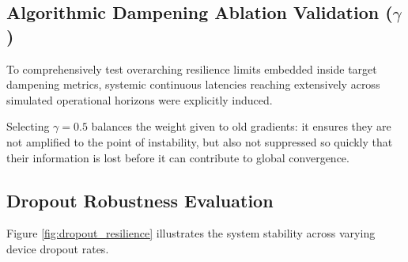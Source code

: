 \documentclass[conference]{IEEEtran}
\begin{document}
\subsection{Algorithmic Dampening Ablation Validation ($\gamma$)}
To comprehensively test overarching resilience limits embedded inside target dampening metrics, systemic continuous latencies reaching extensively across simulated operational horizons were explicitly induced.

\begin{table}[htbp]
\centering
\caption{Decay Metric Stabilization Limits ($\gamma$ scaling)}
\label{tab:dampening}
\begin{center}
\end{center}
\end{table}

Selecting $\gamma = 0.5$ balances the weight given to old gradients: it ensures they are not amplified to the point of instability, but also not suppressed so quickly that their information is lost before it can contribute to global convergence.

\subsection{Dropout Robustness Evaluation}
Figure \ref{fig:dropout_resilience} illustrates the system stability across varying device dropout rates.
\end{document}
